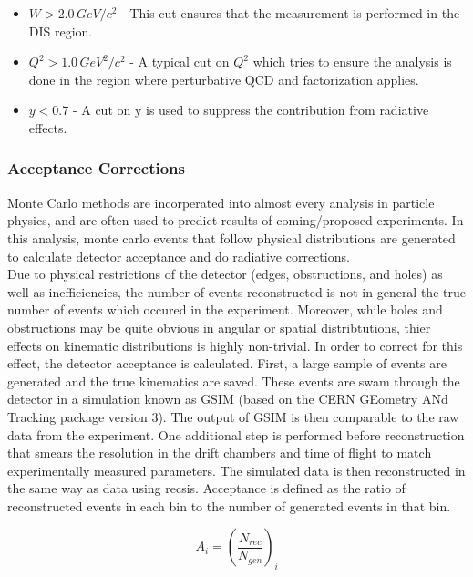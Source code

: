 \begin{itemize}
\item{$W > 2.0 \, GeV/c^{2}$ - This cut ensures that the measurement is performed in the DIS region.}
\item{$Q^{2} > 1.0 \, GeV^{2}/c^{2}$ - A typical cut on $Q^{2}$ which tries to ensure the analysis is done in the region where perturbative QCD and factorization applies.}
\item{$y < 0.7$ - A cut on y is used to suppress the contribution from radiative effects.}
\end{itemize}

\subsubsection{Acceptance Corrections}
Monte Carlo methods are incorperated into almost every analysis in particle physics, and are often used to predict results of coming/proposed experiments.  In this analysis, monte carlo events that follow physical distributions are generated to calculate detector acceptance and do radiative corrections.\\

Due to physical restrictions of the detector (edges, obstructions, and holes) as well as inefficiencies, the number of events reconstructed is not in general the true number of events which occured in the experiment.  Moreover, while holes and obstructions may be quite obvious in angular or spatial distribtutions, thier effects on kinematic distributions is highly non-trivial.  In order to correct for this effect, the detector acceptance is calculated.  First, a large sample of events are generated and the true kinematics are saved.  These events are swam through the detector in a simulation known as GSIM (based on the CERN GEometry ANd Tracking package version 3).  The output of GSIM is then comparable to the raw data from the experiment.  One additional step is performed before reconstruction that smears the resolution in the drift chambers and time of flight to match experimentally measured parameters.  The simulated data is then reconstructed in the same way as data using recsis.  Acceptance is defined as the ratio of reconstructed events in each bin to the number of generated events in that bin.

\begin{equation}
  A_{i} = \left( \frac{N_{rec}}{N_{gen}} \right)_{i}
\end{equation}

